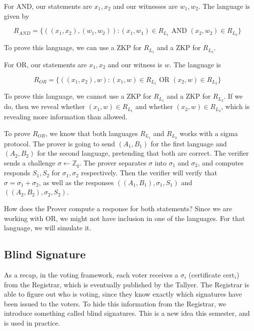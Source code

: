 For AND, our statements are $x_1, x_2$ and our witnesses are $w_1, w_2$. The language is given by

\[ R_{AND} = \{ ((x_1, x_2), (w_1, w_2)): (x_1, w_1) \in R_{L_1} \text{ AND } (x_2, w_2) \in R_{L_2}\}\]

To prove this language, we can use a ZKP for $R_{L_1}$ and a ZKP for $R_{L_2}$.

For OR, our statements are $x_1, x_2$ and our witness is $w$. The language is

\[ R_{OR} = \{ ((x_1, x_2), w): (x_1, w) \in R_{L_1} \text{ OR } (x_2, w) \in R_{L_2}\}\]

To prove this language, we cannot use a ZKP for $R_{L_1}$ and a ZKP for $R_{L_2}$. If we do, then we reveal whether $(x_1, w) \in R_{L_1}$ and whether $(x_2, w) \in R_{L_2}$, which is revealing more information than allowed.

To prove $R_{OR}$, we know that both languages $R_{L_1}$ and $R_{L_2}$ works with a sigma protocol. The prover is going to send $(A_1, B_1)$ for the first language and $(A_2, B_2)$ for the second language, pretending that both are correct. The verifier sends a challenge $\sigma \gets \mathbb{Z}_q$. The prover separates $\sigma$ into $\sigma_1$ and $\sigma_2$, and computes responds $S_1, S_2$ for $\sigma_1, \sigma_2$ respectively. Then the verifier will verify that $\sigma = \sigma_1 + \sigma_2$, as well as the responses $((A_1, B_1), \sigma_1, S_1)$ and $((A_2, B_2), \sigma_2, S_2)$.

How does the Prover compute a response for both statements? Since we are working with OR, we might not have inclusion in one of the languages. For that language, we will simulate it.

\subsection{Blind Signature}

As a recap, in the voting framework, each voter receives a $\sigma_i$ (certificate $\text{cert}_i$) from the Registrar, which is eventually published by the Tallyer. The Registrar is able to figure out who is voting, since they know exactly which signatures have been issued to the voters. To hide this information from the Registrar, we introduce something called blind signatures. This is a new idea this semester, and is used in practice.


